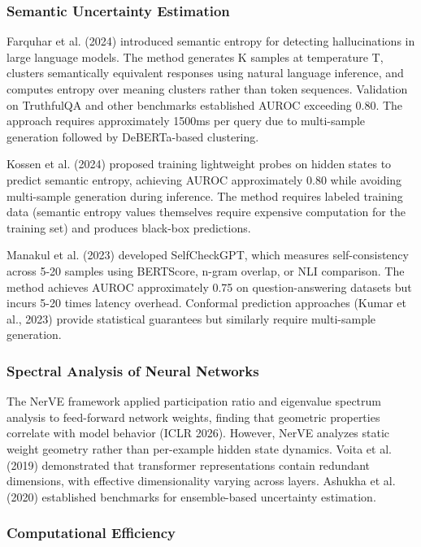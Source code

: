 
\subsubsection{Semantic Uncertainty Estimation}

Farquhar et al. (2024) introduced semantic entropy for detecting hallucinations in large language models. The method generates K samples at temperature T, clusters semantically equivalent responses using natural language inference, and computes entropy over meaning clusters rather than token sequences. Validation on TruthfulQA and other benchmarks established AUROC exceeding 0.80. The approach requires approximately 1500ms per query due to multi-sample generation followed by DeBERTa-based clustering.

Kossen et al. (2024) proposed training lightweight probes on hidden states to predict semantic entropy, achieving AUROC approximately 0.80 while avoiding multi-sample generation during inference. The method requires labeled training data (semantic entropy values themselves require expensive computation for the training set) and produces black-box predictions.

Manakul et al. (2023) developed SelfCheckGPT, which measures self-consistency across 5-20 samples using BERTScore, n-gram overlap, or NLI comparison. The method achieves AUROC approximately 0.75 on question-answering datasets but incurs 5-20 times latency overhead. Conformal prediction approaches (Kumar et al., 2023) provide statistical guarantees but similarly require multi-sample generation.

\subsubsection{Spectral Analysis of Neural Networks}

The NerVE framework applied participation ratio and eigenvalue spectrum analysis to feed-forward network weights, finding that geometric properties correlate with model behavior (ICLR 2026). However, NerVE analyzes static weight geometry rather than per-example hidden state dynamics. Voita et al. (2019) demonstrated that transformer representations contain redundant dimensions, with effective dimensionality varying across layers. Ashukha et al. (2020) established benchmarks for ensemble-based uncertainty estimation.

\subsubsection{Computational Efficiency}

